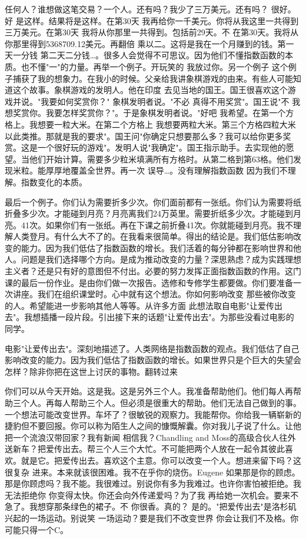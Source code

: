 任何人？谁想做这笔交易？一个人。还有吗？我少了三万美元。还有吗？ 很好。好 是这样。结果将是这样。在第30天 我再给你一千美元。你将从我这里一共得到三万美元。在第30天 我将从你那里一共得到。包括前29天。不 在第30天。我将从你那里得到5368709.12美元。再翻倍 乘以二。这将是我在一个月赚到的钱。第一天一分钱 第二天二分钱…。很多人会觉得不可思议。因为他们不懂指数函数的本质。也不懂"一"的力量。再举一个例子。开玩笑的 我放过你。另一个例子 这个例子捕获了我的想象力。在我小的时候。父亲给我讲象棋游戏的由来。有些人可能知道这个故事。象棋游戏的发明人。他在印度 去见当地的国王。国王很喜欢这个游戏并说。"我要如何奖赏你？" 象棋发明者说。"不必 真得不用奖赏"。国王说"不 我想奖赏你。我要怎样奖赏你？"。于是象棋发明者说。"好吧 我希望。在第一个方格上。我想要一粒大米。在第二个方格上 我想要两粒大米。第三个方格四粒大米 以此类推。那就是我的要求"。国王问"你确定只想要那么多？我可以给你更多奖赏。这是一个很好玩的游戏"。发明人说"我确定"。国王指示助手。去实现他的愿望。当他们开始计算。需要多少粒米填满所有方格时。从第二格到第63格。他们发现米粒。能厚厚地覆盖全世界。再一次 误导…。没有理解指数函数 因为我们不理解。指数变化的本质。 

最后一个例子。你们认为需要折多少次。你们面前都有一张纸。你们认为需要将纸折叠多少次。才能碰到月亮？月亮离我们24万英里。需要折纸多少次。才能碰到月亮。41次。如果你们有一张纸。再在下课之前折叠41次。你就能碰到月亮。我不理解人类登月。有什么大不了的。在我看来很简单。得出的结论是。我们低估影响改变的能力。因为我们低估了指数函数的增长。我们活着的每分钟都在影响世界和他人。问题是我们选择哪个方向。是成为推动改变的力量？深思熟虑？成为实践理想主义者？还是只有好的意图但不付出。必要的努力发挥正面指数函数的作用。这门课的最后一份作业。是由你们做一次报告。选修和专修学生都要做。你们要准备一次讲座。我们在组织课堂时。心中就有这个想法。你如何影响改变 那些被你改变的人。希望能进一步影响其他人等等。从许多方面 此想法取自电影"让爱传出去"。我想插播一段片段。引出接下来的话题"让爱传出去"。为那些没看过电影的同学。 

电影"让爱传出去"。深刻地描述了。人类网络是指数函数的观点。我们低估了自己影响改变的能力。因为我们低估了指数函数的增长。如果世界只是个巨大的失望会怎样？除非你把在这世上讨厌的事物。翻转过来 

你们可以从今天开始。这是我。这是另外三个人。我准备帮助他们。他们每人再帮助三个人。再每人帮助三个人。但必须是很重大的帮助。他们无法自己做到的事。一个想法可能改变世界。车坏了？很敏锐的观察力。我能帮你。你给我一辆崭新的捷豹但不要回报。你可以称为陌生人之间的慷慨解囊。你对我儿子说了什么。让他把一个流浪汉带回家？我有新闻 相信我？Chandling and Moss的高级合伙人往外送新车？把爱传出去。帮三个人三个大忙。不可能把两个人放在一起令其彼此喜欢。就是它。把爱传出去。喜欢这个主意。你可以改变一个人。想进来留下吗？这很复杂 进来。本来就该很困难。我不在乎你的烧伤。Eugene 如果那是你的顾虑。那是你顾虑吗？我不能。我很难过。别说你有多为我难过。也许你害怕被拒绝。我无法拒绝你 你变得太快。你还会向外传递爱吗？为了我 再给她一次机会。要来不急了。我想穿那条绿色的裙子。不 你很香。真的？ 是的。"把爱传出去"是洛杉矶兴起的一场运动。别说笑 一场运动？要是我们不改变世界 你会让我们不及格。你可能只得一个C。 

